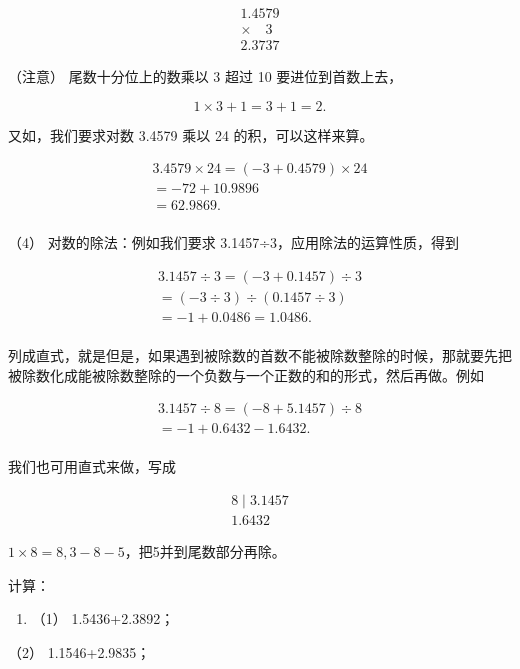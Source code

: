 \[
\begin{array}{r} 1.4579 \\ \times \quad 3 \\ \hline 2.3737 \end{array}
\]

（注意） 尾数十分位上的数乘以 3 超过 10 要进位到首数上去，

\[
1 \times 3 + 1 = 3 + 1 = 2.
\]

又如，我们要求对数 3.4579 乘以 24 的积，可以这样来算。

\[
\begin{array}{l} 3.4579 \times 24 = (- 3 + 0.4579) \times 24 \\ = - 72 + 10.9896 \\ = 62.9869. \\ \end{array}
\]

（4） 对数的除法：例如我们要求 3.1457÷3，应用除法的运算性质，得到

\[
\begin{array}{l} 3.1457 \div 3 = (- 3 + 0.1457) \div 3 \\ = (- 3 \div 3) \div (0.1457 \div 3) \\ = - 1 + 0.0486 = 1.0486. \\ \end{array}
\]

列成直式，就是但是，如果遇到被除数的首数不能被除数整除的时候，那就要先把被除数化成能被除数整除的一个负数与一个正数的和的形式，然后再做。例如

\[
\begin{array}{l} 3.1457 \div 8 = (- 8 + 5.1457) \div 8 \\ = - 1 + 0.6432 - 1.6432. \\ \end{array}
\]

我们也可用直式来做，写成

\[
\begin{array}{rl} {8 \mid 3.1457} \\ \hline {1.6432} \end{array}
\]

 \(1 \times 8 = 8, 3 - 8 - 5\)，把5并到尾数部分再除。

计算：

\begin{enumerate}
\item
  （1） 1.5436+2.3892；
\end{enumerate}

（2） 1.1546+2.9835；


